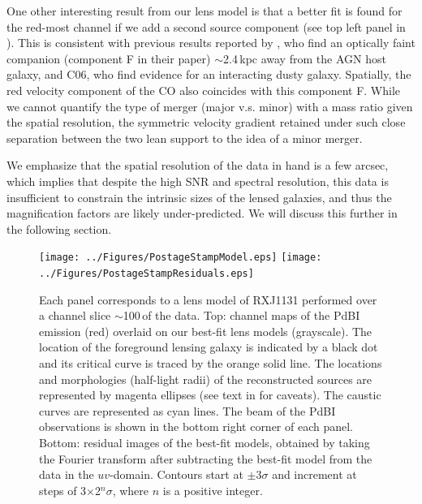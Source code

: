 \documentclass[]{emulateapj}
\begin{document}
One other interesting result from our lens model is that a better fit is
found for the red-most channel if we add a second source component (see
top left panel in ). This is consistent with previous results
reported by \citet{Brewer08a}, who find an optically faint companion
(component F in their paper) $\sim$2.4\,kpc away from the AGN host galaxy,
and C06, who find evidence for an interacting dusty galaxy.
Spatially, the red velocity component of the CO also coincides with this
component F. While we cannot quantify the type of
merger (major v.s. minor) with a mass ratio given the
spatial resolution, the symmetric velocity gradient retained under
such close separation between the two lean support
to the idea of a minor merger.

We emphasize that the spatial resolution of the data in hand
is a few arcsec, which implies that despite the high SNR and spectral
resolution, this data is insufficient to constrain the
intrinsic sizes of the lensed galaxies, and thus the magnification
factors are likely under-predicted.
We will discuss this further in the following section. %

\begin{figure}[tbph]
\texttt{[image: ../Figures/PostageStampModel.eps]}
\texttt{[image: ../Figures/PostageStampResiduals.eps]}
\caption{Each panel corresponds to a lens model of RXJ1131 performed over a
channel slice $\sim$100\,\kms of the \bco data. Top: channel maps of the
PdBI \bco emission (red) overlaid on our best-fit lens models (grayscale).
The location of the foreground lensing galaxy is indicated by a black dot and
its critical curve is traced by the orange solid line. The locations and
morphologies (half-light radii) of the reconstructed sources are
represented by magenta ellipses (see text in  for caveats).
The caustic curves are represented as cyan lines. The beam of the
PdBI observations is shown in the bottom right corner of each panel.
Bottom: residual images of the best-fit models, obtained by
taking the Fourier transform after subtracting the best-fit model from the
data in the $uv$-domain. Contours start
at $\pm$3$\sigma$ and increment at steps of 3$\times$2$^n\sigma$,
where $n$ is a positive integer.
\label{fig:model}}
\end{figure}
\end{document}
